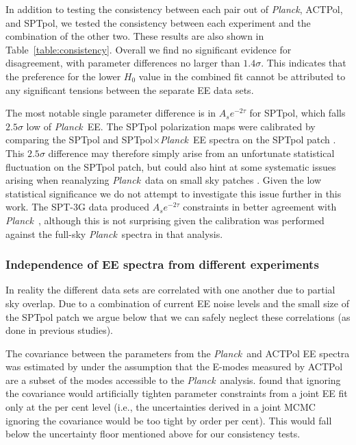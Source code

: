 \documentclass[twocolumn]{aastex63}
\newcommand{\planck}{\textsl{Planck}}
\begin{document}
In addition to testing the consistency between each pair out of \planck, ACTPol, and SPTpol, we tested the consistency between each experiment and the combination of the other two. These results are also shown in Table~\ref{table:consistency}. Overall we find no significant evidence for disagreement, with parameter differences no larger than $1.4\sigma$. This indicates that the preference for the lower $H_0$ value in the combined fit cannot be attributed to any significant tensions between the separate EE data sets.

The most notable single parameter difference is in $A_se^{-2\tau}$ for SPTpol, which falls $2.5\sigma$ low of \planck\ EE. The SPTpol polarization maps were calibrated by comparing the SPTpol and SPTpol$\times$\planck\ EE spectra on the SPTpol patch \citep[Section~7.3 of][]{henning/etal:2018}. This $2.5\sigma$ difference may therefore simply arise from an unfortunate statistical fluctuation on the SPTpol patch, but could also hint at some systematic issues arising when reanalyzing \planck\ data on small sky patches \citep[see also Section 13.3 of][]{choi/etal:2020}. Given the low statistical significance we do not attempt to investigate this issue further in this work. The SPT-3G data produced $A_se^{-2\tau}$ constraints in better agreement with \planck\ \citep[Fig.~9 of][]{dutcher/etal:prep}, although this is not surprising given the calibration was performed against the full-sky \planck\ spectra in that analysis. 

\subsubsection{Independence of EE spectra from different experiments}
\label{sec:resultsconsistencyindep}

In reality the different data sets are correlated with one another due to partial sky overlap. Due to a combination of current EE noise levels and the small size of the SPTpol patch we argue below that we can safely neglect these correlations (as done in previous studies). 

The covariance between the parameters from the \planck\ and ACTPol EE spectra was estimated by \cite{aiola/etal:2020} under the assumption that the E-modes measured by ACTPol are a subset of the modes accessible to the \planck\ analysis. \cite{aiola/etal:2020} found that ignoring the covariance would artificially tighten parameter constraints from a joint EE fit only at the per cent level (i.e., the uncertainties derived in a joint MCMC ignoring the covariance would be too tight by order per cent). This would fall below the uncertainty floor mentioned above for our consistency tests.
\end{document}
